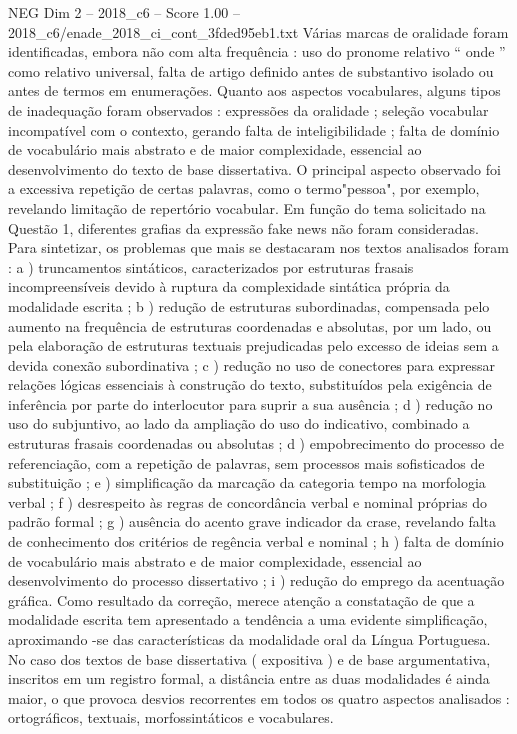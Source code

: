 \begin{textsample}{NEG Dim 2 – 2018\_c6 – Score 1.00 – 2018\_c6/enade\_2018\_ci\_cont\_3fded95eb1.txt}
Várias marcas de oralidade foram identificadas, embora não com alta frequência : uso do pronome relativo “ onde ” como relativo universal, falta de artigo definido antes de substantivo isolado ou antes de termos em enumerações.
Quanto aos aspectos vocabulares, alguns tipos de inadequação foram observados : expressões da oralidade ; seleção vocabular incompatível com o contexto, gerando falta de inteligibilidade ; falta de domínio de vocabulário mais abstrato e de maior complexidade, essencial ao desenvolvimento do texto de base dissertativa.
O principal aspecto observado foi a excessiva repetição de certas palavras, como o termo"pessoa", por exemplo, revelando limitação de repertório vocabular.
Em função do tema solicitado na Questão 1, diferentes grafias da expressão fake news não foram consideradas.
Para sintetizar, os problemas que mais se destacaram nos textos analisados foram : a ) truncamentos sintáticos, caracterizados por estruturas frasais incompreensíveis devido à ruptura da complexidade sintática própria da modalidade escrita ; b ) redução de estruturas subordinadas, compensada pelo aumento na frequência de estruturas coordenadas e absolutas, por um lado, ou pela elaboração de estruturas textuais prejudicadas pelo excesso de ideias sem a devida conexão subordinativa ; c ) redução no uso de conectores para expressar relações lógicas essenciais à construção do texto, substituídos pela exigência de inferência por parte do interlocutor para suprir a sua ausência ; d ) redução no uso do subjuntivo, ao lado da ampliação do uso do indicativo, combinado a estruturas frasais coordenadas ou absolutas ; d ) empobrecimento do processo de referenciação, com a repetição de palavras, sem processos mais sofisticados de substituição ; e ) simplificação da marcação da categoria tempo na morfologia verbal ; f ) desrespeito às regras de concordância verbal e nominal próprias do padrão formal ; g ) ausência do acento grave indicador da crase, revelando falta de conhecimento dos critérios de regência verbal e nominal ; h ) falta de domínio de vocabulário mais abstrato e de maior complexidade, essencial ao desenvolvimento do processo dissertativo ; i ) redução do emprego da acentuação gráfica.
Como resultado da correção, merece atenção a constatação de que a modalidade escrita tem apresentado a tendência a uma evidente simplificação, aproximando -se das características da modalidade oral da Língua Portuguesa.
No caso dos textos de base dissertativa ( expositiva ) e de base argumentativa, inscritos em um registro formal, a distância entre as duas modalidades é ainda maior, o que provoca desvios recorrentes em todos os quatro aspectos analisados : ortográficos, textuais, morfossintáticos e vocabulares.

\end{textsample}
